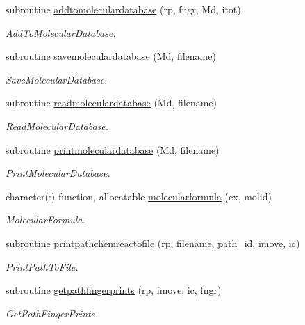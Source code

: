 \begin{DoxyCompactItemize}
subroutine \mbox{\hyperlink{namespacerpath_a259f0a538ae15f09680183f2a259da58}{addtomoleculardatabase}} (rp, fngr, Md, itot)
\begin{DoxyCompactList}\small\item\em Add\+To\+Molecular\+Database. \end{DoxyCompactList}\item 
subroutine \mbox{\hyperlink{namespacerpath_a8d4afda6b550a4857b9800f7d94cb87b}{savemoleculardatabase}} (Md, filename)
\begin{DoxyCompactList}\small\item\em Save\+Molecular\+Database. \end{DoxyCompactList}\item 
subroutine \mbox{\hyperlink{namespacerpath_a296f9413787464666a45c1433ea90a32}{readmoleculardatabase}} (Md, filename)
\begin{DoxyCompactList}\small\item\em Read\+Molecular\+Database. \end{DoxyCompactList}\item 
subroutine \mbox{\hyperlink{namespacerpath_a1163d0179108c7da7f7b0590d9a5b911}{printmoleculardatabase}} (Md, filename)
\begin{DoxyCompactList}\small\item\em Print\+Molecular\+Database. \end{DoxyCompactList}\item 
character(\+:) function, allocatable \mbox{\hyperlink{namespacerpath_ad5763afa90216356bb2694841d938592}{molecularformula}} (cx, molid)
\begin{DoxyCompactList}\small\item\em Molecular\+Formula. \end{DoxyCompactList}\item 
subroutine \mbox{\hyperlink{namespacerpath_a3ea5ea388547f210105034dd8fdab394}{printpathchemreactofile}} (rp, filename, path\+\_\+id, imove, ic)
\begin{DoxyCompactList}\small\item\em Print\+Path\+To\+File. \end{DoxyCompactList}\item 
subroutine \mbox{\hyperlink{namespacerpath_ab5e5d395f73dd82e69efa6977b748dc9}{getpathfingerprints}} (rp, imove, ic, fngr)
\begin{DoxyCompactList}\small\item\em Get\+Path\+Finger\+Prints. \end{DoxyCompactList}\item 

\end{DoxyCompactItemize}
